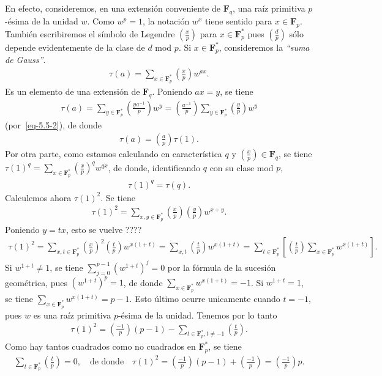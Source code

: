 \documentclass[bibtotoc,leqno,spanish]{amsbook}
\newcommand{\FF}{\mathbf{F}}
\newcommand{\leg}[2]{\left(\frac{#1}{#2}\right)}
\numberwithin{equation}{section}
\theoremstyle{note}
\theoremstyle{note}
\theoremstyle{rem}
\numberwithin{theorem}{section}
\numberwithin{proposition}{section}
\numberwithin{definition}{section}
\numberwithin{lemma}{section}
\numberwithin{corollary}{section}
\numberwithin{example}{section}
\numberwithin{footnote}{section}%
\begin{document}
En efecto, consideremos, en una extensi\'on conveniente de $\FF_{q}$, una ra\'iz primitiva $p$-\'esima de
la unidad $w$. Como $w^{p}=1$, la notaci\'on $w^{x}$ tiene sentido para $x\in\FF_{p}$. Tambi\'en escribiremos
el s\'imbolo de Legendre $\leg{x}{p}$ para $x\in\FF_{p}^{*}$ pues $\leg{d}{p}$ s\'olo depende evidentemente
de la clase de $d$ mod $p$. Si $x\in\FF_{p}^{*}$, consideremos la {\em ``suma de Gauss''}.
\begin{gather}
\tau(a) = \sum_{x\in\FF_{p}^{*}}\leg{x}{p}w^{ax}.
\end{gather}
Es un elemento de una extensi\'on de $\FF_{q}$. Poniendo $ax = y$, se tiene
\begin{gather*}
\tau(a) = \sum_{y\in\FF_{p}^{*}}\leg{ya^{-1}}{p}w^{y} = \leg{a^{-1}}{p}\sum_{y\in\FF_{p}^{*}}\leg{y}{p}w^{y}
\end{gather*}
(por~\eqref{eq-5.5-2}), de donde
\begin{gather}\label{eq-5.5-4}
\tau(a) = \leg{a}{p}\tau(1).
\end{gather}
Por otra parte, como estamos calculando en caracter\'istica $q$ y $\leg{x}{p}\in\FF_{q}$, se tiene
$\tau(1)^{q}=\sum_{x\in\FF_{p}^{*}}\leg{x}{p}^{q}w^{qx}$, de donde, identificando $q$ con su clase mod $p$,
\begin{gather}\label{eq-5.5-5}
\tau(1)^{q}=\tau(q).
\end{gather}
Calculemos ahora $\tau(1)^{2}$. Se tiene
\begin{gather*}
\tau(1)^{2} = \sum_{x,y\in\FF_{p}^{*}}\leg{x}{p}\leg{y}{p}w^{x+y}.
\end{gather*}
Poniendo $y=tx$, esto se vuelve ????
\begin{gather*}
\tau(1)^{2}=\sum_{x,t\in\FF_{p}^{*}}\leg{x}{p}^{2}\leg{t}{p}w^{x(1+t)}=\sum_{x,t}\leg{t}{p}w^{x(1+t)}
=\sum_{t\in\FF_{p}^{*}}\left[\leg{t}{p}\sum_{x\in\FF_{p}^{*}}w^{x(1+t)}\right].
\end{gather*}
Si $w^{1+t}\neq 1$, se tiene $\sum_{j=0}^{p-1}(w^{1+t})^{j}=0$ por la f\'ormula de la sucesi\'on geom\'etrica,
pues $(w^{1+t})^{p}=1$, de donde $\sum_{x\in\FF_{p}^{*}}w^{x(1+t)}=-1$. Si $w^{1+t}=1$, se tiene
$\sum_{x\in\FF_{p}^{*}}w^{x(1+t)}=p-1$. Esto \'ultimo ocurre unicamente cuando $t=-1$, pues
$w$ es una ra\'iz primitiva $p$-\'esima de la unidad. Tenemos por lo tanto
\begin{gather*}
\tau(1)^{2}=\leg{-1}{p}(p-1)-\sum_{t\in\FF_{p}^{*}, t\neq -1}\leg{t}{p}.
\end{gather*}
Como hay tantos cuadrados como no cuadrados en $\FF_{p}^{*}$, se tiene
\begin{gather*}
\sum_{t\in\FF_{p}^{*}}\leg{t}{p}=0,\quad\text{de donde}\quad\tau(1)^{2}=\leg{-1}{p}(p-1)+\leg{-1}{p}=\leg{-1}{p}p.
\end{gather*}
\end{document}
